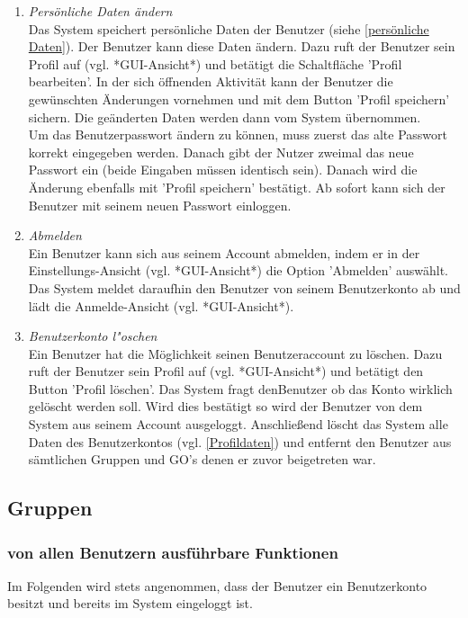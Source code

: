 \documentclass[parskip=full]{scrartcl}
\def\threedigits#1{%
  \ifnum#1<100 0\fi
  \ifnum#1<10 0\fi
  \number#1}
\begin{document}
\begin{enumerate}[label={\textbf{/F\protect\threedigits{\theenumi}0/}}, leftmargin=*]
	\item \textit{Persönliche Daten ändern} \\ Das System speichert persönliche Daten der Benutzer (siehe  \ref{persönliche Daten}). Der Benutzer kann diese Daten ändern. Dazu ruft der Benutzer sein Profil auf (vgl. *GUI-Ansicht*) und betätigt die Schaltfläche 'Profil bearbeiten'. In der sich öffnenden Aktivität kann der Benutzer die gewünschten Änderungen vornehmen und mit dem Button 'Profil speichern' sichern. Die geänderten Daten werden dann vom System übernommen.\\
	Um das Benutzerpasswort ändern zu können, muss zuerst das alte Passwort korrekt eingegeben werden. Danach gibt der Nutzer zweimal das neue Passwort ein (beide Eingaben müssen identisch sein). Danach wird die Änderung ebenfalls mit 'Profil speichern' bestätigt. Ab sofort kann sich der Benutzer mit seinem neuen Passwort einloggen.
	
	\item \textit{Abmelden} \\ Ein Benutzer kann sich aus seinem Account abmelden, indem er in der Einstellungs-Ansicht (vgl. *GUI-Ansicht*) die Option 'Abmelden' auswählt. Das System meldet daraufhin den Benutzer von seinem Benutzerkonto ab und lädt die Anmelde-Ansicht (vgl. *GUI-Ansicht*).
	
	\item \textit{Benutzerkonto l"oschen} \\
	Ein Benutzer hat die Möglichkeit seinen Benutzeraccount zu löschen. Dazu ruft der Benutzer sein Profil auf (vgl. *GUI-Ansicht*) und betätigt den Button 'Profil löschen'. Das System fragt denBenutzer ob das Konto wirklich gelöscht werden soll. Wird dies bestätigt so wird der Benutzer von dem System aus seinem Account ausgeloggt. Anschließend löscht das System alle Daten des Benutzerkontos (vgl. \ref{Profildaten}) und entfernt den Benutzer aus sämtlichen Gruppen und GO's denen er zuvor beigetreten war.
\end{enumerate}

\subsection{Gruppen}

\subsubsection{von allen Benutzern ausführbare Funktionen} %
Im Folgenden wird stets angenommen, dass der Benutzer ein Benutzerkonto besitzt und bereits im System eingeloggt ist.
\end{document}

